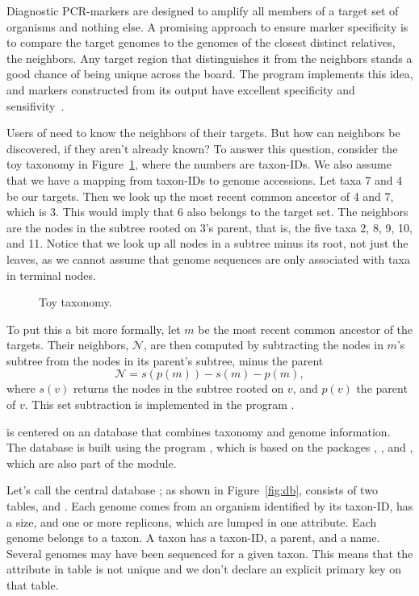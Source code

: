 Diagnostic PCR-markers are designed to amplify all members of a target
set of organisms and nothing else. A promising approach to ensure
marker specificity is to compare the target genomes to the genomes of
the closest distinct relatives, the neighbors. Any target region that
distinguishes it from the neighbors stands a good chance of being
unique across the board. The program  implements this idea,
and markers constructed from its output have excellent specificity and
sensifivity~\cite{hau21:fur}.

Users of  need to know the neighbors of their
targets. But how can neighbors be discovered, if they aren't already
known? To answer this question, consider the toy taxonomy in
Figure~\ref{fig:tax}, where the numbers are taxon-IDs. We also assume
that we have a mapping from taxon-IDs to genome accessions. Let taxa 7
and 4 be our targets. Then we look up the most recent common ancestor
of 4 and 7, which is 3. This would imply that 6 also belongs to the
target set. The neighbors are the nodes in the subtree rooted on 3's
parent, that is, the five taxa 2, 8, 9, 10, and 11. Notice that we
look up all nodes in a subtree minus its root, not just the leaves, as
we cannot assume that genome sequences are only associated with taxa
in terminal nodes.

\begin{figure}
\begin{center}

\end{center}
\caption{Toy taxonomy.}\label{fig:tax}
\end{figure}

To put this a bit more formally, let $m$ be the most recent common
ancestor of the targets. Their neighbors, $\mathcal{N}$, are then
computed by subtracting the nodes in $m$'s subtree from the nodes in
its parent's subtree, minus the parent
\begin{equation}\label{eq:nei}
\mathcal{N} = s(p(m)) - s(m) - p(m),
\end{equation}
where $s(v)$ returns the nodes in the subtree rooted on $v$, and
$p(v)$ the parent of $v$. This set subtraction is implemented in the
program .

 is centered on an 
database that combines taxonomy and genome information. The database
is built using the program , which is based on the
packages , , and , which are also part of the
 module.

Let's call the central database ; as shown in
Figure~\ref{fig:db},  consists of two
tables,  and . Each genome comes from an organism
identified by its taxon-ID, has a size, and one or more replicons,
which are lumped in one attribute. Each genome belongs to a taxon. A
taxon has a taxon-ID, a parent, and a name. Several genomes may have
been sequenced for a given taxon. This means that the
attribute  in table  is not unique and we don't
declare an explicit primary key on that table.

